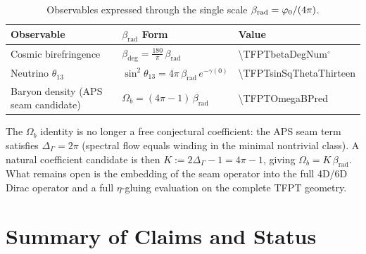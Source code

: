 \begin{table}[H]
\centering
\begin{tabular}{@{}lll@{}}
\toprule
\textbf{Observable} & \textbf{$\beta_{\text{rad}}$ Form} & \textbf{Value}\\
\midrule
Cosmic birefringence & $\beta_{\text{deg}} = \frac{180}{\pi}\,\beta_{\text{rad}}$ & \num[round-mode=places,round-precision=4]{\TFPTbetaDegNum}$^\circ$\\
Neutrino $\theta_{13}$ & $\sin^2\theta_{13} = 4\pi\,\beta_{\text{rad}}\,e^{-\gamma(0)}$ & \num[round-mode=places,round-precision=6]{\TFPTsinSqThetaThirteen}\\
Baryon density (APS seam candidate) & $\Omega_b = (4\pi - 1)\,\beta_{\text{rad}}$ & \num[round-mode=places,round-precision=6]{\TFPTOmegaBPred}\\
\bottomrule
\end{tabular}
\caption{Observables expressed through the single scale $\beta_{\text{rad}} = \varphi_0/(4\pi)$.}
\label{tab:beta}
\end{table}

\begin{remark}
The $\Omega_b$ identity is no longer a free conjectural coefficient: the APS seam term satisfies $\Delta_\Gamma=2\pi$ (spectral flow equals winding in the minimal nontrivial class).
A natural coefficient candidate is then $K:=2\Delta_\Gamma-1=4\pi-1$, giving $\Omega_b=K\,\beta_{\mathrm{rad}}$.
What remains open is the embedding of the seam operator into the full 4D/6D Dirac operator and a full $\eta$-gluing evaluation on the complete TFPT geometry.
\end{remark}

\TFPTOmegaBTable

\section{Summary of Claims and Status}

